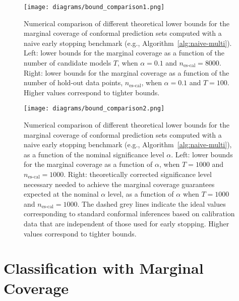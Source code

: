 \begin{figure}
    \centering
    \texttt{[image: diagrams/bound\_comparison1.png]}
    \caption{Numerical comparison of different theoretical lower bounds for the marginal coverage of conformal prediction sets computed with a naive early stopping benchmark (e.g., Algorithm~\ref{alg:naive-multi}). Left: lower bounds for the marginal coverage as a function of the number of candidate models $T$, when $\alpha=0.1$ and $n_{\text{es-cal}}=8000$.
Right: lower bounds for the marginal coverage as a function of the number of hold-out data points, $n_{\text{es-cal}}$, when $\alpha=0.1$ and $T=100$. Higher values correspond to tighter bounds.
}
    \label{fig:bound_tn}
\end{figure}


\begin{figure}
    \centering
    \texttt{[image: diagrams/bound\_comparison2.png]}
    \caption{Numerical comparison of different theoretical lower bounds for the marginal coverage of conformal prediction sets computed with a naive early stopping benchmark (e.g., Algorithm~\ref{alg:naive-multi}), as a function of the nominal significance level $\alpha$. Left: lower bounds for the marginal coverage as a function of $\alpha$, when $T = 1000$ and $n_{\text{es-cal}}= 1000$.
Right: theoretically corrected significance level necessary needed to achieve the marginal coverage guarantees expected at the nominal $\alpha$ level, as a function of $\alpha$ when $T = 1000$ and $n_{\text{es-cal}}= 1000$. The dashed grey lines indicate the ideal values corresponding to standard conformal inferences based on calibration data that are independent of those used for early stopping. Higher values correspond to tighter bounds.
}
    \label{fig:bound_alpha}
\end{figure}



\section{Classification with Marginal Coverage} \label{app:class-marg}

